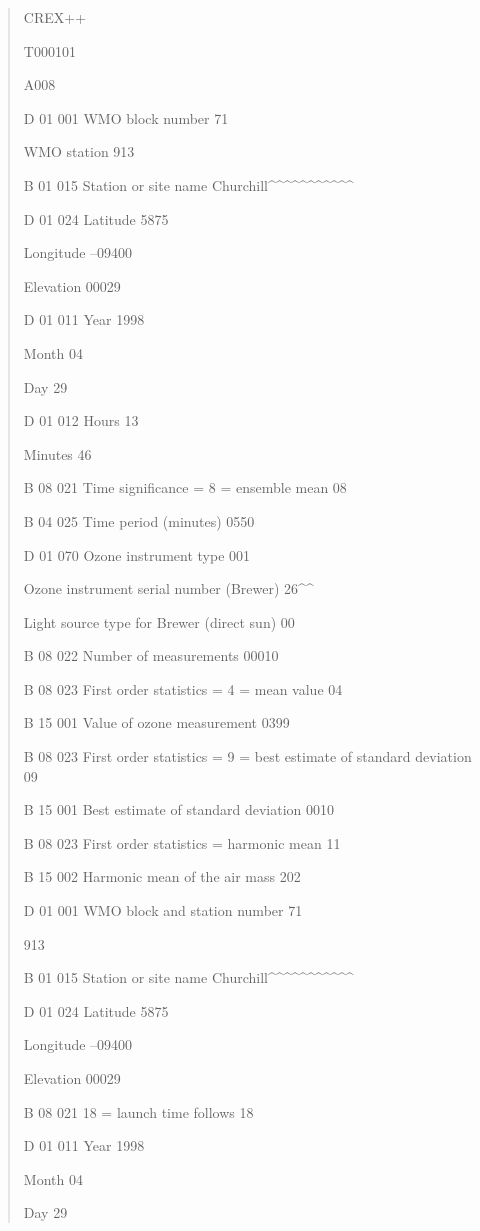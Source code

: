 \begin{quote}
CREX++

T000101

A008

D 01 001 WMO block number 71

WMO station 913

B 01 015 Station or site name Churchill\^{}\^{}\^{}\^{}\^{}\^{}\^{}\^{}\^{}\^{}\^{}

D 01 024 Latitude 5875

Longitude --09400

Elevation 00029

D 01 011 Year 1998

Month 04

Day 29

D 01 012 Hours 13

Minutes 46

B 08 021 Time significance = 8 = ensemble mean 08

B 04 025 Time period (minutes) 0550

D 01 070 Ozone instrument type 001

Ozone instrument serial number (Brewer) 26\^{}\^{}

Light source type for Brewer (direct sun) 00

B 08 022 Number of measurements 00010

B 08 023 First order statistics = 4 = mean value 04

B 15 001 Value of ozone measurement 0399

B 08 023 First order statistics = 9 = best estimate of standard deviation 09

B 15 001 Best estimate of standard deviation 0010

B 08 023 First order statistics = harmonic mean 11

B 15 002 Harmonic mean of the air mass 202

D 01 001 WMO block and station number 71

913

B 01 015 Station or site name Churchill\^{}\^{}\^{}\^{}\^{}\^{}\^{}\^{}\^{}\^{}\^{}

D 01 024 Latitude 5875

Longitude --09400

Elevation 00029

B 08 021 18 = launch time follows 18

D 01 011 Year 1998

Month 04

Day 29


\end{quote}
